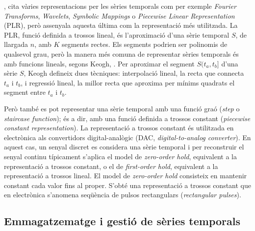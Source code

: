 \textcite{last:keogh}, cita vàries representacions per les sèries temporals com per exemple \emph{Fourier Transforms}, \emph{Wavelets}, \emph{Symbolic Mappings} o \emph{Piecewise Linear Representation} (PLR), però assenyala aquesta última com la representació més utilitzada. 
La PLR, funció definida a trossos lineal, és l'aproximació d'una sèrie temporal $S$, de llargada $n$, amb $K$ segments rectes. Els segments podrien ser polinomis de qualsevol grau, però la manera més comuna de representar sèries temporals és amb funcions lineals, segons Keogh, \cite{keogh02}.
Per aproximar el segment $S(t_a,t_b]$ d'una sèrie $S$, Keogh defineix dues tècniques: interpolació lineal, la recta que connecta $t_a$ i $t_b$, i regressió lineal, la millor recta que aproxima per mínims quadrats el segment entre $t_a$ i $t_b$.

Però també es pot representar una sèrie temporal amb una funció graó (\emph{step} o \emph{staircase function}); és a dir, amb una funció definida a trossos constant (\emph{piecewise constant representation}).
La representació a trossos constant és utilitzada en electrònica als convertidors digital-analògic (DAC, \emph{digital-to-analog converter}). En aquest cas, un senyal discret es considera una sèrie temporal i per reconstruir el senyal continu típicament s'aplica el model de \emph{zero-order hold}, equivalent a la representació a trossos constant,  o el de \emph{first-order hold},  equivalent a la representació a trossos lineal.
El model de \emph{zero-order hold} consisteix en mantenir constant cada valor fins al proper. S'obté una representació a trossos constant que en electrònica s'anomena seqüència de pulsos rectangulars (\emph{rectangular pulses}).










\subsection{Emmagatzematge i gestió de sèries temporals}


